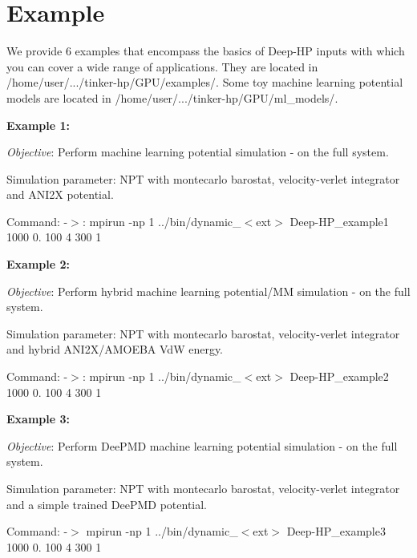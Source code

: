 \section*{Example}

We provide 6 examples that encompass the basics of Deep-\/\-H\-P inputs with which you can cover a wide range of applications. They are located in {\ttfamily /home/user/.../tinker-\/hp/\-G\-P\-U/examples/}. Some toy machine learning potential models are located in {\ttfamily /home/user/.../tinker-\/hp/\-G\-P\-U/ml\-\_\-models/}.


\begin{DoxyItemize}
\item {\bfseries Example 1\-:} \par
 {\itshape Objective}\-: Perform machine learning potential simulation -\/ on the full system. \par
 Simulation parameter\-: N\-P\-T with montecarlo barostat, velocity-\/verlet integrator and A\-N\-I2\-X potential. \par
 Command\-: -\/$>$\-: {\ttfamily mpirun -\/np 1 ../bin/dynamic\-\_\-$<$ext$>$ Deep-\/\-H\-P\-\_\-example1 1000 0. 100 4 300 1} \par

\item {\bfseries Example 2\-:} \par
 {\itshape Objective}\-: Perform hybrid machine learning potential/\-M\-M simulation -\/ on the full system.\par
 Simulation parameter\-: N\-P\-T with montecarlo barostat, velocity-\/verlet integrator and hybrid A\-N\-I2\-X/\-A\-M\-O\-E\-B\-A Vd\-W energy.\par
 Command\-: -\/$>$\-: {\ttfamily mpirun -\/np 1 ../bin/dynamic\-\_\-$<$ext$>$ Deep-\/\-H\-P\-\_\-example2 1000 0. 100 4 300 1}\par

\item {\bfseries Example 3\-:}\par
 {\itshape Objective}\-: Perform Dee\-P\-M\-D machine learning potential simulation -\/ on the full system.\par
 Simulation parameter\-: N\-P\-T with montecarlo barostat, velocity-\/verlet integrator and a simple trained Dee\-P\-M\-D potential. \par
 Command\-: -\/$>$ {\ttfamily mpirun -\/np 1 ../bin/dynamic\-\_\-$<$ext$>$ Deep-\/\-H\-P\-\_\-example3 1000 0. 100 4 300 1}\par


\end{DoxyItemize}
